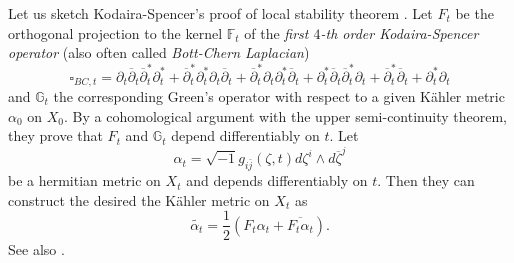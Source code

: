 \documentclass[12pt]{amsart}
\numberwithin{equation}{section}
\newcommand{\w}{\wedge}
\renewcommand{\1}{\mathds{1}}
\newcommand{\G}{\mathbb{G}}
\newcommand{\db}{\overline{\partial}}
\renewcommand{\>}{\rightarrow}
\newcommand{\p}{\partial}
\def\p{\partial}
\def\w{\wedge}
\begin{document}
Let us sketch Kodaira-Spencer's proof of local stability theorem
\cite{KS}. Let $F_t$ be the orthogonal projection to the kernel
$\mathds{F}_t$ of the \emph{first $4$-th order Kodaira-Spencer
operator} (also often called \emph{Bott-Chern Laplacian})
\begin{equation}\label{bc-Lap}
\square_{{BC},t}=\p_t\db_t\db_t^*\p_t^*+\db_t^*\p_t^*\p_t\db_t+\db_t^*\p_t\p_t^*\db_t+\p_t^*\db_t\db_t^*\p_t+\db_t^*\db_t+\p_t^*\p_t
\end{equation}
and $\G_t$ the corresponding Green's operator with respect to a given K\"ahler metric $\alpha_0$ on $X_0$. By a cohomological
argument with the upper semi-continuity theorem, they prove that
$F_t$ and $\G_t$ depend differentiably on $t$. Let
$$\alpha_t=\sqrt{-1}g_{i\bar{j}}(\zeta,t)d \zeta^i \w d \overline{\zeta}^j$$
be a hermitian metric on $X_t$ and depends differentiably on $t$. Then they can
construct the desired the K\"ahler metric on $X_t$ as
$$\widetilde{\alpha_t}=\frac{1}{2}(F_t\alpha_t+\overline{F_t\alpha_t}).$$
See also \cite[Subsection 9.3]{V}.
\end{document}
